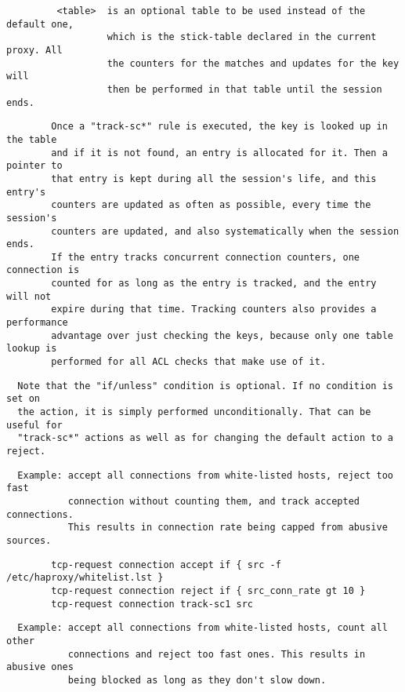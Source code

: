 \begin{verbatim}
         <table>  is an optional table to be used instead of the default one,
                  which is the stick-table declared in the current proxy. All
                  the counters for the matches and updates for the key will
                  then be performed in that table until the session ends.
\end{verbatim}

\begin{verbatim}
        Once a "track-sc*" rule is executed, the key is looked up in the table
        and if it is not found, an entry is allocated for it. Then a pointer to
        that entry is kept during all the session's life, and this entry's
        counters are updated as often as possible, every time the session's
        counters are updated, and also systematically when the session ends.
        If the entry tracks concurrent connection counters, one connection is
        counted for as long as the entry is tracked, and the entry will not
        expire during that time. Tracking counters also provides a performance
        advantage over just checking the keys, because only one table lookup is
        performed for all ACL checks that make use of it.
\end{verbatim}

\begin{verbatim}
  Note that the "if/unless" condition is optional. If no condition is set on
  the action, it is simply performed unconditionally. That can be useful for
  "track-sc*" actions as well as for changing the default action to a reject.
\end{verbatim}

\begin{verbatim}
  Example: accept all connections from white-listed hosts, reject too fast
           connection without counting them, and track accepted connections.
           This results in connection rate being capped from abusive sources.
\end{verbatim}

\begin{verbatim}
        tcp-request connection accept if { src -f /etc/haproxy/whitelist.lst }
        tcp-request connection reject if { src_conn_rate gt 10 }
        tcp-request connection track-sc1 src
\end{verbatim}

\begin{verbatim}
  Example: accept all connections from white-listed hosts, count all other
           connections and reject too fast ones. This results in abusive ones
           being blocked as long as they don't slow down.
\end{verbatim}

